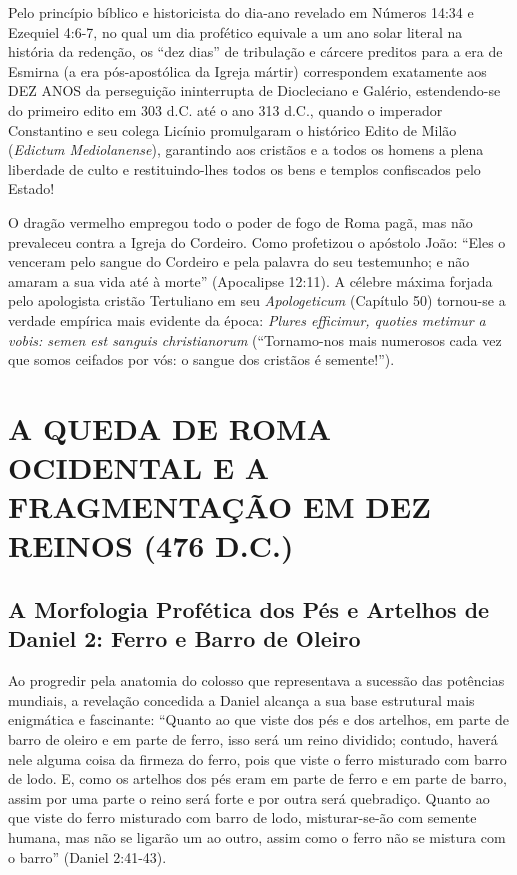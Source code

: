 \documentclass[11pt,a4paper,openany]{book}
\begin{document}
Pelo princípio bíblico e historicista do dia-ano revelado em Números 14:34 e Ezequiel 4:6-7, no qual um dia profético equivale a um ano solar literal na história da redenção, os ``dez dias'' de tribulação e cárcere preditos para a era de Esmirna (a era pós-apostólica da Igreja mártir) correspondem exatamente aos DEZ ANOS da perseguição ininterrupta de Diocleciano e Galério, estendendo-se do primeiro edito em 303 d.C. até o ano 313 d.C., quando o imperador Constantino e seu colega Licínio promulgaram o histórico Edito de Milão (\textit{Edictum Mediolanense}), garantindo aos cristãos e a todos os homens a plena liberdade de culto e restituindo-lhes todos os bens e templos confiscados pelo Estado!

O dragão vermelho empregou todo o poder de fogo de Roma pagã, mas não prevaleceu contra a Igreja do Cordeiro. Como profetizou o apóstolo João: ``Eles o venceram pelo sangue do Cordeiro e pela palavra do seu testemunho; e não amaram a sua vida até à morte'' (Apocalipse 12:11). A célebre máxima forjada pelo apologista cristão Tertuliano em seu \textit{Apologeticum} (Capítulo 50) tornou-se a verdade empírica mais evidente da época: \textit{Plures efficimur, quoties metimur a vobis: semen est sanguis christianorum} (``Tornamo-nos mais numerosos cada vez que somos ceifados por vós: o sangue dos cristãos é semente!'').



\section{A QUEDA DE ROMA OCIDENTAL E A FRAGMENTAÇÃO EM DEZ REINOS (476 D.C.)}



\subsection{A Morfologia Profética dos Pés e Artelhos de Daniel 2: Ferro e Barro de Oleiro}


Ao progredir pela anatomia do colosso que representava a sucessão das potências mundiais, a revelação concedida a Daniel alcança a sua base estrutural mais enigmática e fascinante:
``Quanto ao que viste dos pés e dos artelhos, em parte de barro de oleiro e em parte de ferro, isso será um reino dividido; contudo, haverá nele alguma coisa da firmeza do ferro, pois que viste o ferro misturado com barro de lodo. E, como os artelhos dos pés eram em parte de ferro e em parte de barro, assim por uma parte o reino será forte e por outra será quebradiço. Quanto ao que viste do ferro misturado com barro de lodo, misturar-se-ão com semente humana, mas não se ligarão um ao outro, assim como o ferro não se mistura com o barro'' (Daniel 2:41-43).
\end{document}

